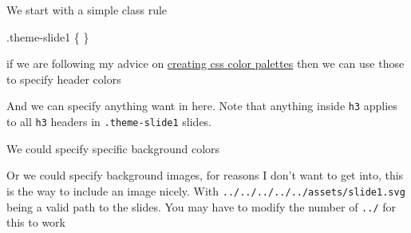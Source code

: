 \documentclass[
  letterpaper,
  DIV=11,
  numbers=noendperiod]{scrreprt}
\newenvironment{Shaded}{\begin{snugshade}}{\end{snugshade}}
\newcommand{\CommentTok}[1]{\textcolor[rgb]{0.37,0.37,0.37}{#1}}
\newcommand{\ConstantTok}[1]{\textcolor[rgb]{0.56,0.35,0.01}{#1}}
\newcommand{\DataTypeTok}[1]{\textcolor[rgb]{0.68,0.00,0.00}{#1}}
\newcommand{\DecValTok}[1]{\textcolor[rgb]{0.68,0.00,0.00}{#1}}
\newcommand{\FunctionTok}[1]{\textcolor[rgb]{0.28,0.35,0.67}{#1}}
\newcommand{\KeywordTok}[1]{\textcolor[rgb]{0.00,0.23,0.31}{\textbf{#1}}}
\newcommand{\NormalTok}[1]{\textcolor[rgb]{0.00,0.23,0.31}{#1}}
\newcommand{\OperatorTok}[1]{\textcolor[rgb]{0.37,0.37,0.37}{#1}}
\newcommand{\VariableTok}[1]{\textcolor[rgb]{0.07,0.07,0.07}{#1}}
\begin{document}
We start with a simple class rule

\begin{Shaded}
\begin{Highlighting}[]
\FunctionTok{.theme{-}slide1}\NormalTok{ \{}
\NormalTok{\}}
\end{Highlighting}
\end{Shaded}

if we are following my advice on
\href{https://www.emilhvitfeldt.com/post/slidecraft-colors-fonts/\#applying-colors}{creating
css color palettes} then we can use those to specify header colors

\begin{Shaded}
\end{Shaded}

And we can specify anything want in here. Note that anything inside
\texttt{h3} applies to all \texttt{h3} headers in \texttt{.theme-slide1}
slides.

\begin{Shaded}
\end{Shaded}

We could specify specific background colors

\begin{Shaded}
\end{Shaded}

Or we could specify background images, for reasons I don't want to get
into, this is the way to include an image nicely. With
\texttt{../../../../../assets/slide1.svg} being a valid path to the
slides. You may have to modify the number of \texttt{../} for this to
work
\end{document}
